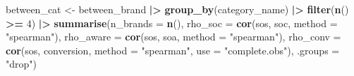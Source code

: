 \documentclass[
]{article}
\newenvironment{Shaded}{\begin{snugshade}}{\end{snugshade}}
\newcommand{\AttributeTok}[1]{\textcolor[rgb]{0.13,0.29,0.53}{#1}}
\newcommand{\DecValTok}[1]{\textcolor[rgb]{0.00,0.00,0.81}{#1}}
\newcommand{\FunctionTok}[1]{\textcolor[rgb]{0.13,0.29,0.53}{\textbf{#1}}}
\newcommand{\NormalTok}[1]{#1}
\newcommand{\OtherTok}[1]{\textcolor[rgb]{0.56,0.35,0.01}{#1}}
\newcommand{\SpecialCharTok}[1]{\textcolor[rgb]{0.81,0.36,0.00}{\textbf{#1}}}
\newcommand{\StringTok}[1]{\textcolor[rgb]{0.31,0.60,0.02}{#1}}
\begin{document}
\begin{Shaded}
\begin{Highlighting}[]
\NormalTok{between\_cat }\OtherTok{\textless{}{-}}\NormalTok{ between\_brand }\SpecialCharTok{|\textgreater{}}
  \FunctionTok{group\_by}\NormalTok{(category\_name) }\SpecialCharTok{|\textgreater{}}
  \FunctionTok{filter}\NormalTok{(}\FunctionTok{n}\NormalTok{() }\SpecialCharTok{\textgreater{}=} \DecValTok{4}\NormalTok{) }\SpecialCharTok{|\textgreater{}}
  \FunctionTok{summarise}\NormalTok{(}\AttributeTok{n\_brands =} \FunctionTok{n}\NormalTok{(),}
            \AttributeTok{rho\_soc =} \FunctionTok{cor}\NormalTok{(sos, soc, }\AttributeTok{method =} \StringTok{"spearman"}\NormalTok{),}
            \AttributeTok{rho\_aware =} \FunctionTok{cor}\NormalTok{(sos, soa, }\AttributeTok{method =} \StringTok{"spearman"}\NormalTok{),}
            \AttributeTok{rho\_conv =} \FunctionTok{cor}\NormalTok{(sos, conversion, }\AttributeTok{method =} \StringTok{"spearman"}\NormalTok{, }\AttributeTok{use =} \StringTok{"complete.obs"}\NormalTok{),}
            \AttributeTok{.groups =} \StringTok{"drop"}\NormalTok{)}
\end{Highlighting}
\end{Shaded}
\end{document}
